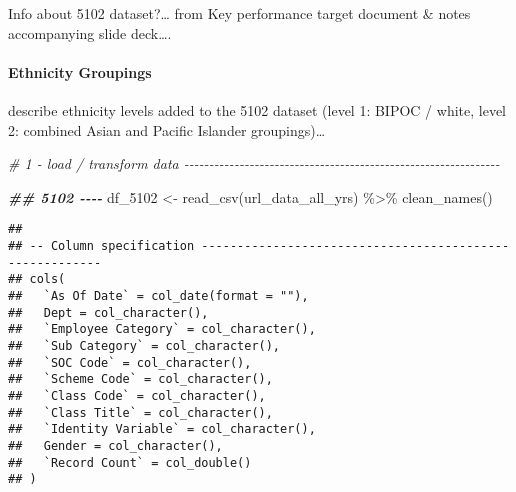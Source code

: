 \documentclass[
]{article}
\newenvironment{Shaded}{\begin{snugshade}}{\end{snugshade}}
\newcommand{\CommentTok}[1]{\textcolor[rgb]{0.56,0.35,0.01}{\textit{#1}}}
\newcommand{\DocumentationTok}[1]{\textcolor[rgb]{0.56,0.35,0.01}{\textbf{\textit{#1}}}}
\newcommand{\FunctionTok}[1]{\textcolor[rgb]{0.00,0.00,0.00}{#1}}
\newcommand{\NormalTok}[1]{#1}
\newcommand{\OtherTok}[1]{\textcolor[rgb]{0.56,0.35,0.01}{#1}}
\newcommand{\SpecialCharTok}[1]{\textcolor[rgb]{0.00,0.00,0.00}{#1}}
\begin{document}
Info about 5102 dataset?\ldots{} from Key performance target document \&
notes accompanying slide deck\ldots.

\hypertarget{ethnicity-groupings}{%
\paragraph{Ethnicity Groupings}\label{ethnicity-groupings}}

describe ethnicity levels added to the 5102 dataset (level 1: BIPOC /
white, level 2: combined Asian and Pacific Islander groupings)\ldots{}

\begin{Shaded}
\begin{Highlighting}[]
\CommentTok{\# 1 {-} load / transform data {-}{-}{-}{-}{-}{-}{-}{-}{-}{-}{-}{-}{-}{-}{-}{-}{-}{-}{-}{-}{-}{-}{-}{-}{-}{-}{-}{-}{-}{-}{-}{-}{-}{-}{-}{-}{-}{-}{-}{-}{-}{-}{-}{-}{-}{-}{-}{-}{-}{-}{-}{-}{-}{-}{-}{-}{-}{-}{-}{-}{-}{-}{-}}

\DocumentationTok{\#\# 5102 {-}{-}{-}{-}}
\NormalTok{df\_5102 }\OtherTok{\textless{}{-}} \FunctionTok{read\_csv}\NormalTok{(url\_data\_all\_yrs) }\SpecialCharTok{\%\textgreater{}\%}
    \FunctionTok{clean\_names}\NormalTok{() }
\end{Highlighting}
\end{Shaded}

\begin{verbatim}
## 
## -- Column specification --------------------------------------------------------
## cols(
##   `As Of Date` = col_date(format = ""),
##   Dept = col_character(),
##   `Employee Category` = col_character(),
##   `Sub Category` = col_character(),
##   `SOC Code` = col_character(),
##   `Scheme Code` = col_character(),
##   `Class Code` = col_character(),
##   `Class Title` = col_character(),
##   `Identity Variable` = col_character(),
##   Gender = col_character(),
##   `Record Count` = col_double()
## )
\end{verbatim}
\end{document}
